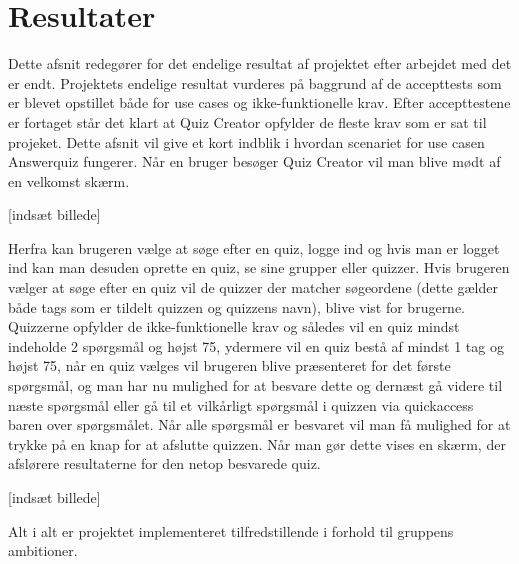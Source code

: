 \section{Resultater}
Dette afsnit redegører for det endelige resultat af projektet efter arbejdet med det er endt. Projektets endelige resultat vurderes på baggrund af de accepttests som er blevet opstillet både for use cases og ikke-funktionelle krav. Efter accepttestene er fortaget står det klart at Quiz Creator opfylder de fleste krav som er sat til projeket. Dette afsnit vil give et kort indblik i hvordan scenariet for use casen Answerquiz fungerer. Når en bruger besøger Quiz Creator vil man blive mødt af en velkomst skærm.

[indsæt billede]

Herfra kan brugeren vælge at søge efter en quiz, logge ind og hvis man er logget ind kan man desuden oprette en quiz, se sine grupper eller quizzer. Hvis brugeren vælger at søge efter en quiz vil de quizzer der matcher søgeordene (dette gælder både tags som er tildelt quizzen og quizzens navn), blive vist for brugerne. Quizzerne opfylder de ikke-funktionelle krav og således vil en quiz mindst indeholde 2 spørgsmål og højst 75, ydermere vil en quiz bestå af mindst 1 tag og højst 75, når en quiz vælges vil brugeren blive præsenteret for det første spørgsmål, og man har nu mulighed for at besvare dette og dernæst gå videre til næste spørgsmål eller gå til et vilkårligt spørgsmål i quizzen via quickaccess baren over spørgsmålet. Når alle spørgsmål er besvaret vil man få mulighed for at trykke på en knap for at afslutte quizzen. Når man gør dette vises en skærm, der afslørere resultaterne for den netop besvarede quiz.

[indsæt billede]

Alt i alt er projektet implementeret tilfredstillende i forhold til gruppens ambitioner. 

